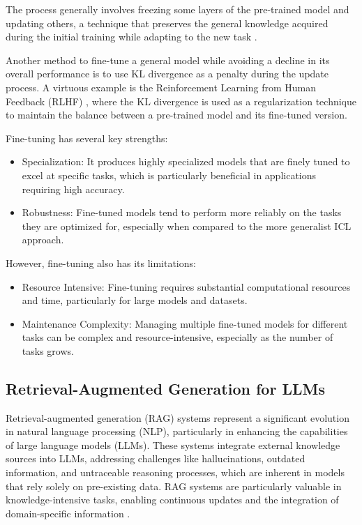 The process generally involves freezing some layers of the pre-trained model and updating others, a technique that preserves the general knowledge acquired during the initial training while adapting to the new task \cite{wang2023egeriaefficientdnntraining}.

Another method to fine-tune a general model while avoiding a decline in its overall performance is to use KL divergence as a penalty during the update process. A virtuous example is the Reinforcement Learning from Human Feedback (RLHF) \cite{kaufmann2024surveyreinforcementlearninghuman}, where the KL divergence is used as a regularization technique to maintain the balance between a pre-trained model and its fine-tuned version.

Fine-tuning has several key strengths:
\begin{itemize}
    \item Specialization: It produces highly specialized models that are finely tuned to excel at specific tasks, which is particularly beneficial in applications requiring high accuracy.
    \item Robustness: Fine-tuned models tend to perform more reliably on the tasks they are optimized for, especially when compared to the more generalist ICL approach.
\end{itemize}


However, fine-tuning also has its limitations:
\begin{itemize}
    \item Resource Intensive: Fine-tuning requires substantial computational resources and time, particularly for large models and datasets.
    \item Maintenance Complexity: Managing multiple fine-tuned models for different tasks can be complex and resource-intensive, especially as the number of tasks grows.
\end{itemize}

\subsection{Retrieval-Augmented Generation for LLMs}
Retrieval-augmented generation (RAG) systems represent a significant evolution in natural language processing (NLP), particularly in enhancing the capabilities of large language models (LLMs). These systems integrate external knowledge sources into LLMs, addressing challenges like hallucinations, outdated information, and untraceable reasoning processes, which are inherent in models that rely solely on pre-existing data. RAG systems are particularly valuable in knowledge-intensive tasks, enabling continuous updates and the integration of domain-specific information \cite{gao2024retrievalaugmentedgenerationlargelanguage}.

